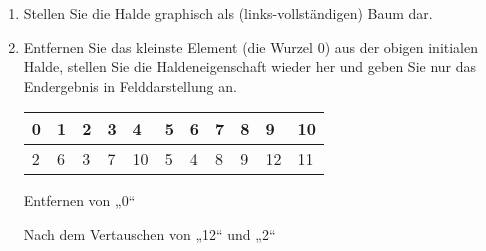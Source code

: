 \documentclass{bschlangaul-aufgabe}
\begin{document}
\begin{enumerate}


\item Stellen Sie die Halde graphisch als (links-vollständigen) Baum
dar.

\begin{bAntwort}
\begin{center}
\end{center}
\end{bAntwort}


\item Entfernen Sie das kleinste Element (die Wurzel 0) aus der obigen
initialen Halde, stellen Sie die Haldeneigenschaft wieder her und geben
Sie nur das Endergebnis in Felddarstellung an.

\begin{bAntwort}
\begin{tabular}{lllllllllll}
\bf{0}  & \bf{1}  & \bf{2}  & \bf{3}  & \bf{4}  & \bf{5}  & \bf{6}  & \bf{7}  & \bf{8}  & \bf{9}  & \bf{10} \\
\hline
2       & 6       & 3       & 7       & 10      & 5       & 4       & 8       & 9       & 12      & 11      \\
\end{tabular}
\end{bAntwort}

\begin{bAdditum}[zu b)]
\begin{bBaum}{Entfernen von „0“}
\end{bBaum}

\begin{bBaum}{Nach dem Vertauschen von „12“ und „2“}
\end{bBaum}


\end{bAdditum}
\end{enumerate}
\end{document}
